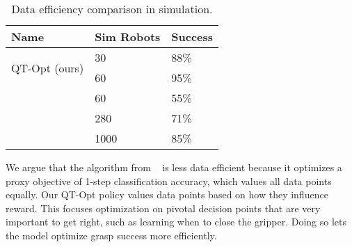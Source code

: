 \documentclass{article}
\begin{document}
\begin{table}[h]
\begin{center}
\begin{tabular}{ |p{7em}|p{5em}|p{3em}| }
\hline
Name & Sim Robots &
Success \\
\hline
\multirow{2}{7em}{QT-Opt (ours)} & 30 & 88\% \\
&60 & 95\% \\
\hline
\multirow{3}{7em}{\citet{levine16}} & 60 & 55\% \\
& 280 & 71\% \\
& 1000 & 85\% \\
 \hline
\end{tabular}
\end{center}
\caption{Data efficiency comparison in simulation.}
\label{table:sim-data-eff}
\vspace{-0.25in}
\end{table}
We argue that the algorithm from ~\citet{levine16} is less data efficient because it optimizes a proxy objective of 1-step classification accuracy, which values all data points equally. Our QT-Opt policy values data points based on how they influence reward. This focuses optimization on pivotal decision points that are very important to get right, such as learning when to close the gripper. Doing so lets the model optimize grasp success more efficiently.
\end{document}
